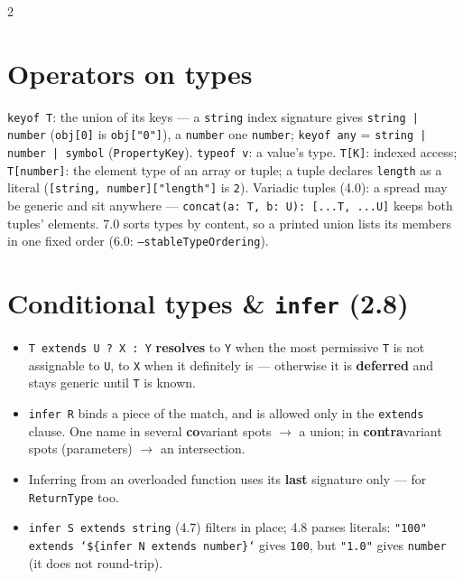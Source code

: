 \documentclass[8pt]{extarticle}
\newcommand\ct[1]{\texttt{#1}}
\begin{document}
\begin{multicols}{2}
\section{Operators on types}
\ct{keyof T}: the union of its keys — a \ct{string} index signature gives \ct{string | number}
(\ct{obj[0]} is \ct{obj["0"]}), a \ct{number} one \ct{number}; \ct{keyof any} =
\ct{string | number | symbol} (\ct{PropertyKey}). \ct{typeof v}: a value's type. \ct{T[K]}: indexed
access; \ct{T[number]}: the element type of an array or tuple; a tuple declares \ct{length} as a
literal (\ct{[string, number]["length"]} is \ct{2}). Variadic tuples (4.0): a spread may be generic
and sit anywhere — \ct{concat(a: T, b: U): [...T, ...U]} keeps both tuples' elements. 7.0 sorts
types by content, so a printed union lists its members in one fixed order (6.0:
\ct{--stableTypeOrdering}).

\section{Conditional types \& \texttt{infer} (2.8)}
\begin{itemize}
  \item \ct{T extends U ? X : Y} \textbf{resolves} to \ct{Y} when the most permissive \ct{T} is
        not assignable to \ct{U}, to \ct{X} when it definitely is — otherwise it is
        \textbf{deferred} and stays generic until \ct{T} is known.
  \item \ct{infer R} binds a piece of the match, and is allowed only in the \ct{extends} clause.
        One name in several \textbf{co}variant spots $\to$ a union; in \textbf{contra}variant
        spots (parameters) $\to$ an intersection.
  \item Inferring from an overloaded function uses its \textbf{last} signature only — for
        \ct{ReturnType} too.
  \item \ct{infer S extends string} (4.7) filters in place; 4.8 parses literals:
        \ct{"100" extends `\$\{infer N extends number\}`} gives \ct{100}, but \ct{"1.0"} gives
        \ct{number} (it does not round-trip).
\end{itemize}


\end{multicols}
\end{document}
